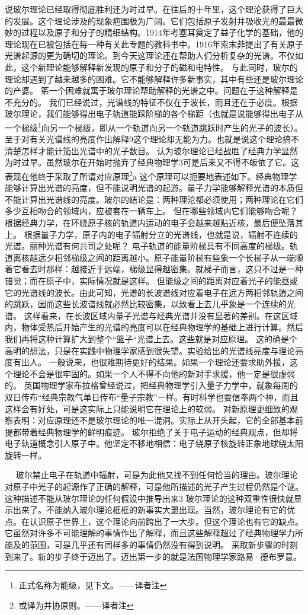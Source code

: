 说玻尔理论已经取得彻底胜利还为时过早。在往后的十年里，这个理沦获得了巨大的发展。这个理论涉及的现象疤围极为广阔。它们包括原子发射并吸收光的最最微妙的过程以及原子和分子的精细结构。1914年考塞耳奠定了益子化学的基础，他的理论现在已被包括在每一种有关此专题的教科书中。1916年索末菲提出了有关原子光谱起源的更为确切的理论。到今天这理论还在帮助人们分析复杂的光谱。不仅如此，这个新理论能够解释新发现的原子和分子的磁和电特性。
与此同时，玻尔的理论却遇到了越来越多的困难。它不能够解释许多新事实，其中有些还是玻尔理论的产婆。
笫一个困难就寓于玻尔理论帮助解释的光谱之中。问题在于这种解释是不充分的。
我们已经说过，光谱线的特征不仅在于波长，而且还在于必度。根据玻尔理论，我们能够得出电子轨道能跺阶梯的各个梯距（也就是说能够得出电子从一个梯级\footnote{正式名称为能级，见下文。——译者注}向另一个梯级，即从一个轨道向另一个轨道跳跃时产生的光子的波长）。至于对有关光谱线的亮度作出解释9这个理论却无能为力。也就是说这个理论搞不清楚怎样才能计笳出光谱中的光子数目。
认为玻尔理论已经战胜了经典力学显然为时过早。虽然玻尔在开始时抛弃了经典物理学3可是后来又不得不皈依了它。这表现在他终于采取了所谓对应原理\footnote{或译为并协原则。——译者注}a
这个原理可以扼要地表述如下。经典物理学能够计算出光谱的亮度，但不能说明光谱的起游。量子力学能够解释光谱的本质但不能计算出光谱线的亮度。玻尔的结论是：两种理沦都必须使用；两种理论在它们多少互相吻合的领域内，应被套在一辆车上。
但在哪些领域内它们能够吻合呢？根据经典力学，在环绕原子核的轨道内运动的电子会越来越贴近核，最后便坠落其上。
根据量子力学，原子内的电子辐射分立的光谱线，也就是说，辐射不连续的光谱。丽种光谱有何共司之处呢？
电子轨道的能量阶梯具有不同高度的梯级。轨道离核越远夕相邻梯级之间的距离越小。原子能量阶梯有些象一个长梯子从一端顺着它看去时那样：越接近于远端，梯级显得越密集。就梯子而言，这只不过是一种错觉；而在原子中，实际情况就是这样。
但能级之间的距离对应着光子的能昼或它的光谱线的波长。由此可知，光谱的长波谱线对应着电子在远方两相邻轨逍之间的跳跃，因而这些长波谱线就必然比较密集，以致看上去儿乎象是一个连续的光谱。
这样看来，在长波区域内量子光谱与经典光谱并没有显著的差别。在这区域内，物体受热后开始产生的光谱的亮度可以在经典物理学的基础上进行计算。然后我们再将这种计算扩大到整个“篮子“光谱上去。这些就是对应原理。
这的确是个高明的想法，只是在实践中物理学家感到很失望。实验给出的光谱线亮度与理论亮度有出人。
一般说来，也很难期待更好的结果。如果一个理论还要求助外援，这个理论不会是很牢固的。如果一个人不得不向他的新对手求援，他一定是很虚弱的。
英国物理学家布拉格曾经说过，把经典物理学引入量子力学中，就象每周的双日传布“经典宗教气单日传布“量子宗教”一样。有时科学也要信奉两个神，而且这样会有好处，可是这实际上只能说明它在理论上的软弱。
对新原理更细致的观察表明：对应原理还不是玻尔理论的唯一混洞。实际上从开头起，它的全部基本前提都带着经典物理学的鲜明痕迹。
玻尔拒绝了关于电子运动的经典观点，但却将电子轨道概念引人原子中。他坚定不移地相信：电子绕原子核旋转正象地球绕太阳旋转一样。

  
玻尔禁止电子在轨道中辐射，可是为此他又找不到任何恰当的理由。玻尔理论对原子中光子的起源作了正确的解释，可是他所描述的光子产生过程仍然是个谜。这种描述不能从玻尔理论的任何假设中推导出来3
玻尔理论的这种双重性很快就显示出来了。不能纳入玻尔理论框框的新事实大噩出现。当然，玻尔理论有它的优点。在认识原子世界上，这个理论向前跨出了一大步。但这个理论也有它的缺点。它虽然对许多不可能理解的事情作出了解释，而且这些解释超过了经典物理学力所能及的范围，可是几乎还有同样多的事情仍然没有得到说明。
采取新步骤的时刻到来了。新的步子终于迈出了。迈出第一步的就是法国物理学家路易·德布罗意。

